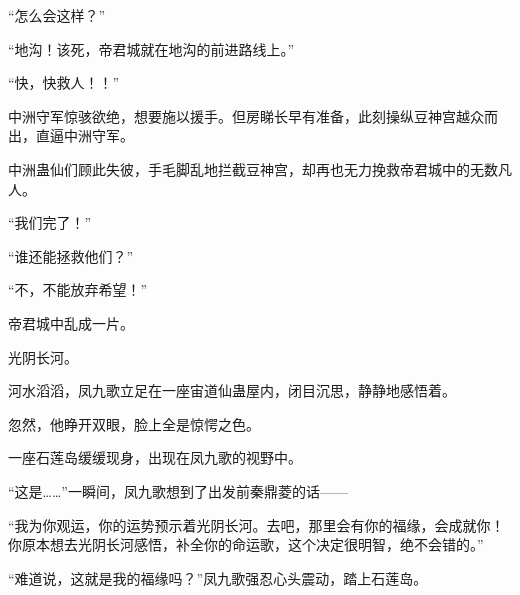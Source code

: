 \begin{this_body}
“怎么会这样？”

“地沟！该死，帝君城就在地沟的前进路线上。”

“快，快救人！！”

中洲守军惊骇欲绝，想要施以援手。但房睇长早有准备，此刻操纵豆神宫越众而出，直逼中洲守军。

中洲蛊仙们顾此失彼，手毛脚乱地拦截豆神宫，却再也无力挽救帝君城中的无数凡人。

“我们完了！”

“谁还能拯救他们？”

“不，不能放弃希望！”

帝君城中乱成一片。

光阴长河。

河水滔滔，凤九歌立足在一座宙道仙蛊屋内，闭目沉思，静静地感悟着。

忽然，他睁开双眼，脸上全是惊愕之色。

一座石莲岛缓缓现身，出现在凤九歌的视野中。

“这是……”一瞬间，凤九歌想到了出发前秦鼎菱的话——

“我为你观运，你的运势预示着光阴长河。去吧，那里会有你的福缘，会成就你！你原本想去光阴长河感悟，补全你的命运歌，这个决定很明智，绝不会错的。”

“难道说，这就是我的福缘吗？”凤九歌强忍心头震动，踏上石莲岛。

\end{this_body}

